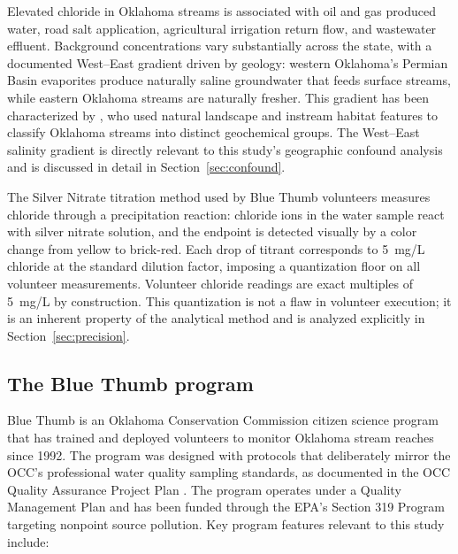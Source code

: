 \documentclass[lineno]{wlpeerj}
\begin{document}
Elevated chloride in Oklahoma streams is associated with oil and gas produced water, road salt application, agricultural irrigation return flow, and wastewater effluent. Background concentrations vary substantially across the state, with a documented West--East gradient driven by geology: western Oklahoma's Permian Basin evaporites produce naturally saline groundwater that feeds surface streams, while eastern Oklahoma streams are naturally fresher. This gradient has been characterized by \citet{Dyer2025}, who used natural landscape and instream habitat features to classify Oklahoma streams into distinct geochemical groups. The West--East salinity gradient is directly relevant to this study's geographic confound analysis and is discussed in detail in Section~\ref{sec:confound}.

The Silver Nitrate titration method used by Blue Thumb volunteers measures chloride through a precipitation reaction: chloride ions in the water sample react with silver nitrate solution, and the endpoint is detected visually by a color change from yellow to brick-red. Each drop of titrant corresponds to 5~mg/L chloride at the standard dilution factor, imposing a quantization floor on all volunteer measurements. Volunteer chloride readings are exact multiples of 5~mg/L by construction. This quantization is not a flaw in volunteer execution; it is an inherent property of the analytical method and is analyzed explicitly in Section~\ref{sec:precision}.

\subsection{The Blue Thumb program}

Blue Thumb is an Oklahoma Conservation Commission citizen science program that has trained and deployed volunteers to monitor Oklahoma stream reaches since 1992. The program was designed with protocols that deliberately mirror the OCC's professional water quality sampling standards, as documented in the OCC Quality Assurance Project Plan \citep[QAPP;][]{Bond2026}. The program operates under a Quality Management Plan and has been funded through the EPA's Section 319 Program targeting nonpoint source pollution. Key program features relevant to this study include:
\end{document}
